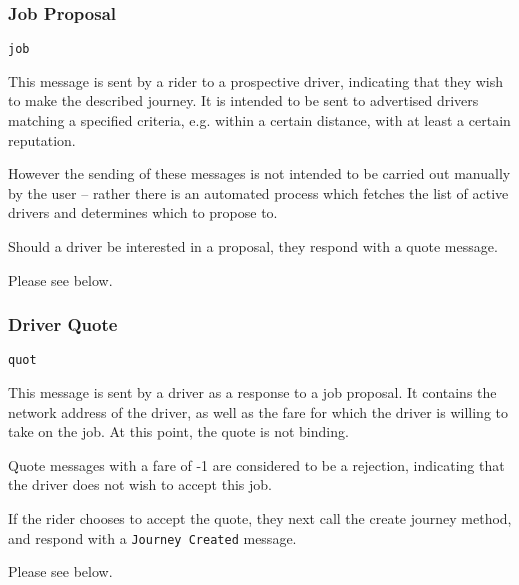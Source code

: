 \subsubsection{Job Proposal}

\begin{description}[leftmargin=6em,style=nextline]
	\item [Topic]
		\lstinline{job}
	\item [Purpose]
		This message is sent by a rider to a prospective driver, indicating that they wish to make the described journey. It is intended to be sent to advertised drivers matching a specified criteria, e.g. within a certain distance, with at least a certain reputation.
		
		However the sending of these messages is not intended to be carried out manually by the user -- rather there is an automated process which fetches the list of active drivers and determines which to propose to.
	\item [Response]
		Should a driver be interested in a proposal, they respond with a quote message.
	\item [Payload]
		Please see below.
\end{description}



\subsubsection{Driver Quote}

\begin{description}[leftmargin=6em,style=nextline]
	\item [Topic]
		\lstinline{quot}
	\item [Purpose]
		This message is sent by a driver as a response to a job proposal. It contains the network address of the driver, as well as the fare for which the driver is willing to take on the job. At this point, the quote is not binding.
		
		Quote messages with a fare of -1 are considered to be a rejection, indicating that the driver does not wish to accept this job.
	\item [Response]
		If the rider chooses to accept the quote, they next call the create journey method, and respond with a \lstinline{Journey Created} message.
	\item [Payload]
		Please see below.
\end{description}



